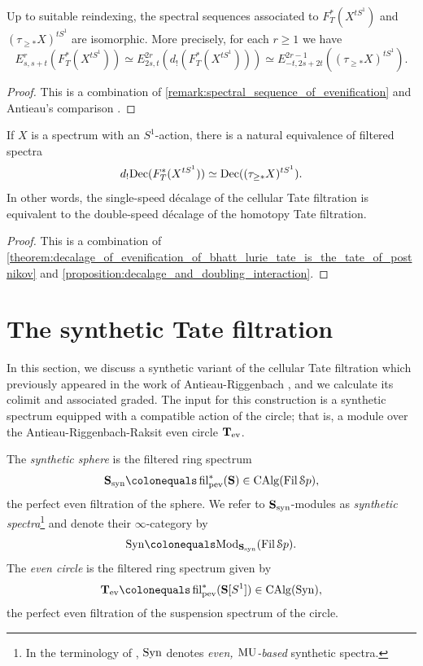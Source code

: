 \documentclass[oneside,a4paper]{amsart}
\begin{document}
\begin{corollary}
\label{corollary:bt_tate_and_standard_tate_have_isomorphic_spectral_sequences}
Up to suitable reindexing, the spectral sequences associated to $F^{\ast}_{T}(X^{tS^{1}})$ and $(\tau_{\geq \ast} X)^{tS^{1}}$ are isomorphic. More precisely, for each $r \geq 1$ we have 
\[
E^{r}_{s, s+t}(F_{T}^{\ast}(X^{tS^{1}})) \simeq E^{2r}_{2s, t}(d_{!}(F_{T}^{\ast}(X^{tS^{1}}))) \simeq E^{2r-1}_{-t, 2s+2t}((\tau_{\geq \ast} X)^{tS^{1}}). 
\]
\end{corollary}

\begin{proof}
This is a combination of \cref{remark:spectral_sequence_of_evenification} and Antieau's comparison \cite[{Theorem 4.13}]{antieau:decalage}. 
\end{proof}

\begin{corollary}
\label{corollary:decalaged_cellular_tate_is_double_of_decalaged_postnikov_tate}
If $X$ is a spectrum with an $S^{1}$-action, there is a natural equivalence of filtered spectra 
\[
d_{!} \mathrm{Dec}(F_{T}^{\ast}(X^{tS^{1}})) \simeq \mathrm{Dec}((\tau_{\geq \ast} X)^{tS^{1}}). 
\]
In other words, the single-speed d\'{e}calage of the cellular Tate filtration is equivalent to the double-speed d\'{e}calage of the homotopy Tate filtration. 
\end{corollary}

\begin{proof}
This is a combination of \cref{theorem:decalage_of_evenification_of_bhatt_lurie_tate_is_the_tate_of_postnikov} and \cref{proposition:decalage_and_doubling_interaction}. 
\end{proof}


\section{The synthetic Tate filtration} 
\label{section:synthetic_tate_filtration}

In this section, we discuss a synthetic variant of the cellular Tate filtration which previously appeared in the work of Antieau-Riggenbach \cite[{Proof of Lemma 2.75}]{antieau2024cyclotomic}, and we calculate its colimit and associated graded. The input for this construction is a synthetic spectrum equipped with a compatible action of the circle; that is, a module over the Antieau-Riggenbach-Raksit even circle $\mathbf{T}_{\mathrm{ev}}$. 

\begin{notation} The \emph{synthetic sphere} is the filtered ring spectrum 
\[
\synsphere \colonequals \fil_{\pev}^{\ast}(\thesphere) \in \CAlg(\Fil \spectra), 
\]
the perfect even filtration of the sphere. We refer to $\mathbf{S}_{\mathrm{syn}}$-modules as \emph{synthetic spectra}\footnote{In the terminology of \cite{pstrkagowski2023synthetic}, $\mathrm{Syn}$ denotes \emph{even, $\mathrm{MU}$-based} synthetic spectra.} and denote their $\infty$-category by 
\[
\synspectra \colonequals \Mod_{\synsphere}(\Fil \spectra). 
\]
The \emph{even circle} is the filtered ring spectrum given by 
\[
\evencircle \colonequals \fil^{\ast}_{\pev}(\thesphere[S^{1}]) \in \CAlg(\synspectra),
\]
the perfect even filtration of the suspension spectrum of the circle. 
\end{notation}
\end{document}
